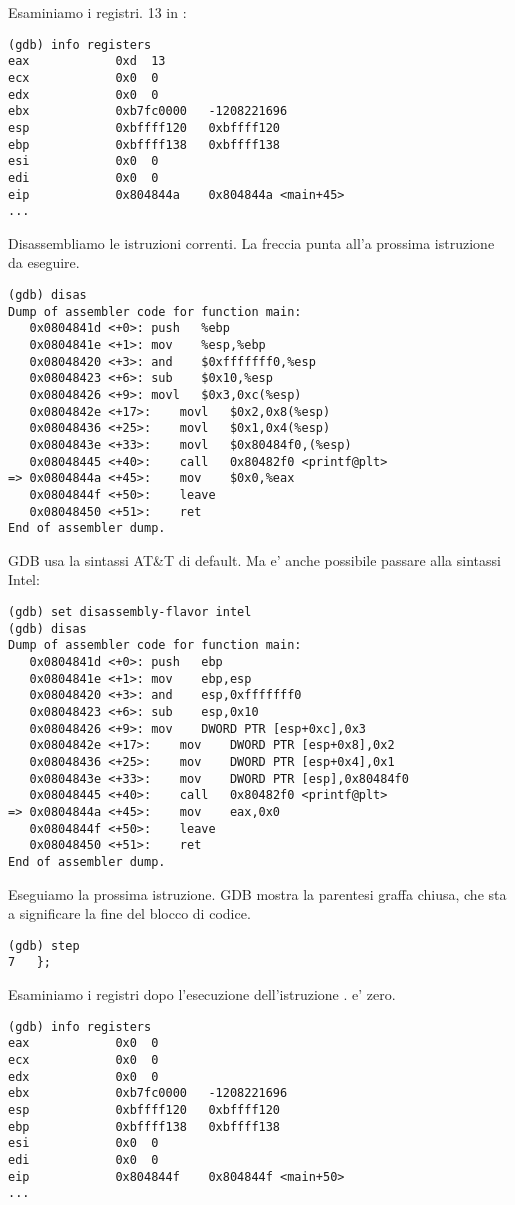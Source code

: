 Esaminiamo i registri.
13 in \EAX:

\begin{lstlisting}
(gdb) info registers
eax            0xd	13
ecx            0x0	0
edx            0x0	0
ebx            0xb7fc0000	-1208221696
esp            0xbffff120	0xbffff120
ebp            0xbffff138	0xbffff138
esi            0x0	0
edi            0x0	0
eip            0x804844a	0x804844a <main+45>
...
\end{lstlisting}

Disassembliamo le istruzioni correnti.
La freccia punta all'a prossima istruzione da eseguire.

\begin{lstlisting}[style=customasmx86]
(gdb) disas
Dump of assembler code for function main:
   0x0804841d <+0>:	push   %ebp
   0x0804841e <+1>:	mov    %esp,%ebp
   0x08048420 <+3>:	and    $0xfffffff0,%esp
   0x08048423 <+6>:	sub    $0x10,%esp
   0x08048426 <+9>:	movl   $0x3,0xc(%esp)
   0x0804842e <+17>:	movl   $0x2,0x8(%esp)
   0x08048436 <+25>:	movl   $0x1,0x4(%esp)
   0x0804843e <+33>:	movl   $0x80484f0,(%esp)
   0x08048445 <+40>:	call   0x80482f0 <printf@plt>
=> 0x0804844a <+45>:	mov    $0x0,%eax
   0x0804844f <+50>:	leave  
   0x08048450 <+51>:	ret    
End of assembler dump.
\end{lstlisting}

\ac{GDB} usa la sintassi AT\&T di default.
Ma e' anche possibile passare alla sintassi Intel:

\begin{lstlisting}[style=customasmx86]
(gdb) set disassembly-flavor intel
(gdb) disas
Dump of assembler code for function main:
   0x0804841d <+0>:	push   ebp
   0x0804841e <+1>:	mov    ebp,esp
   0x08048420 <+3>:	and    esp,0xfffffff0
   0x08048423 <+6>:	sub    esp,0x10
   0x08048426 <+9>:	mov    DWORD PTR [esp+0xc],0x3
   0x0804842e <+17>:	mov    DWORD PTR [esp+0x8],0x2
   0x08048436 <+25>:	mov    DWORD PTR [esp+0x4],0x1
   0x0804843e <+33>:	mov    DWORD PTR [esp],0x80484f0
   0x08048445 <+40>:	call   0x80482f0 <printf@plt>
=> 0x0804844a <+45>:	mov    eax,0x0
   0x0804844f <+50>:	leave  
   0x08048450 <+51>:	ret    
End of assembler dump.
\end{lstlisting}

Eseguiamo la prossima istruzione.
\ac{GDB} mostra la parentesi graffa chiusa, che sta a significare la fine del blocco di codice.

\begin{lstlisting}
(gdb) step
7	};
\end{lstlisting}

Esaminiamo i registri dopo l'esecuzione dell'istruzione .
\EAX e' zero.

\begin{lstlisting}
(gdb) info registers
eax            0x0	0
ecx            0x0	0
edx            0x0	0
ebx            0xb7fc0000	-1208221696
esp            0xbffff120	0xbffff120
ebp            0xbffff138	0xbffff138
esi            0x0	0
edi            0x0	0
eip            0x804844f	0x804844f <main+50>
...
\end{lstlisting}
